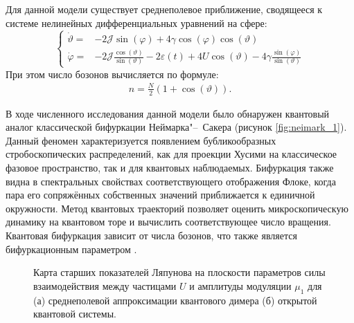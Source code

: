 Для данной модели существует среднеполевое приближение, сводящееся к системе нелинейных дифференциальных уравнений на сфере:
\begin{equation}
	\label{eq:dimer_meanfield_ode_sphere}
	\left\{
	\begin{array}{rl}
		\dot{\vartheta} = & -2\mathcal{J}\sin{\left(\varphi\right)} + 4\gamma \cos{\left(\varphi\right)}\cos{\left(\vartheta\right)} \\
		\dot{\varphi} = & -2 \mathcal{J} \frac{\cos{\left(\vartheta\right)}}{\sin{\left(\vartheta\right)}} - 2\varepsilon\left(t\right) + 4U \cos{\left(\vartheta\right)} - 4\gamma\frac{\sin{\left(\varphi\right)}}{\sin{\left(\vartheta\right)}}
	\end{array}
	\right.
\end{equation}
При этом число бозонов вычисляется по формуле:
\begin{equation}
	\label{eq:dimer_meanfield_num_bosons}
	\begin{gathered}
		n=\frac{N}{2}(1+\cos{\left(\vartheta\right)}).
	\end{gathered}
\end{equation}

В ходе численного исследования данной модели было обнаружен квантовый аналог классической бифуркации Неймарка"--~Сакера (рисунок \cref{fig:neimark_1}).
Данный феномен характеризуется появлением бубликообразных стробоскопических распределений, как для проекции Хусими на классическое фазовое пространство, так и для квантовых наблюдаемых.
Бифуркация также видна в спектральных свойствах соответствующего отображения Флоке, когда пара его сопряжённых собственных значений приближается к единичной окружности.
Метод квантовых траекторий позволяет оценить микроскопическую динамику на квантовом торе и вычислить соответствующее число вращения.
Квантовая бифуркация зависит от числа бозонов, что также является бифуркационным параметром \cite{Yusipov2019_1}.

\begin{figure}[h!]
	\legend{}
	\caption[]
	{
		Карта старших показателей Ляпунова на плоскости параметров силы взаимодействия между частицами $U$ и амплитуды модуляции $\mu_1$ для (а) среднеполевой аппроксимации квантового димера (б) открытой квантовой системы.
	}
	\label{fig:le_1}
\end{figure}

